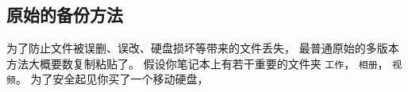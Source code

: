 
\subsection{原始的备份方法}
为了防止文件被误删、误改、硬盘损坏等带来的文件丢失， 最普通原始的多版本方法大概要数复制粘贴了。 假设你笔记本上有若干重要的文件夹 \verb|工作|， \verb|相册|， \verb|视频|。 为了安全起见你买了一个移动硬盘， 
